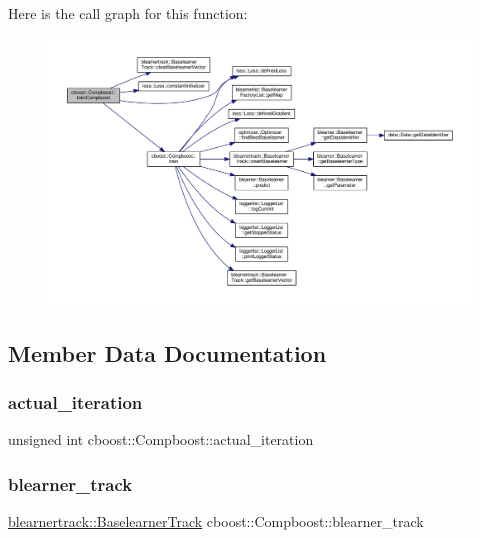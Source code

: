 Here is the call graph for this function\+:
\nopagebreak
\begin{figure}[H]
\begin{center}
\leavevmode
\includegraphics[width=350pt]{classcboost_1_1_compboost_a3689a0d4517ec30905ef5ae46b1cb9c9_cgraph}
\end{center}
\end{figure}


\subsection{Member Data Documentation}
\mbox{\label{classcboost_1_1_compboost_a3db81c285c1cd238d0fb65dfc6c00439}} 
\subsubsection{\texorpdfstring{actual\+\_\+iteration}{actual\_iteration}}
{\footnotesize\ttfamily unsigned int cboost\+::\+Compboost\+::actual\+\_\+iteration\hspace{0.3cm}{\ttfamily [private]}}

\mbox{\label{classcboost_1_1_compboost_af9c2787818f591941f74af0059ca7dc9}} 
\subsubsection{\texorpdfstring{blearner\+\_\+track}{blearner\_track}}
{\footnotesize\ttfamily \hyperlink{classblearnertrack_1_1_baselearner_track}{blearnertrack\+::\+Baselearner\+Track} cboost\+::\+Compboost\+::blearner\+\_\+track\hspace{0.3cm}{\ttfamily [private]}}

